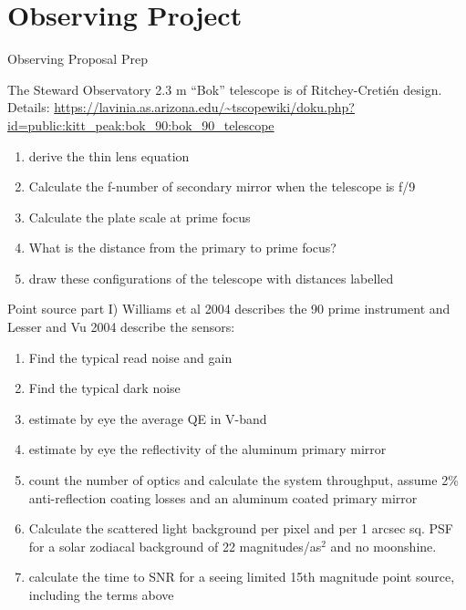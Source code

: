 \section{Observing Project}


\begin{frame}{Observing Proposal Prep}
    
The Steward Observatory 2.3 m ``Bok'' telescope is of Ritchey-Cretién design.%
 Details: \url{https://lavinia.as.arizona.edu/~tscopewiki/doku.php?id=public:kitt_peak:bok_90:bok_90_telescope}
 
 \begin{enumerate}
 \item derive the thin lens equation
\item Calculate the f-number of secondary mirror when the telescope is f/9
\item Calculate the plate scale at prime focus
\item What is the distance from the primary to prime focus?
\item draw these configurations of the telescope with distances labelled
\end{enumerate}
\end{frame}

\begin{frame}{Point source part I)}
Williams et al 2004 describes the 90 prime instrument and Lesser and Vu 2004 describe the sensors:
\begin{enumerate}
    \item Find the typical read noise and gain
    \item Find the typical dark noise
    \item  estimate by eye the average QE in V-band
    \item estimate by eye the reflectivity of the aluminum primary mirror
    \item count the number of optics and calculate the system throughput, assume 2\% anti-reflection coating losses and an aluminum coated primary mirror
    \item Calculate the scattered light background per pixel and per 1 arcsec sq. PSF for a solar zodiacal background of 22 magnitudes/as$^2$ and no moonshine. 
    \item calculate the time to SNR for a seeing limited 15th magnitude point source, including the terms above
\end{enumerate}
    
\end{frame}

